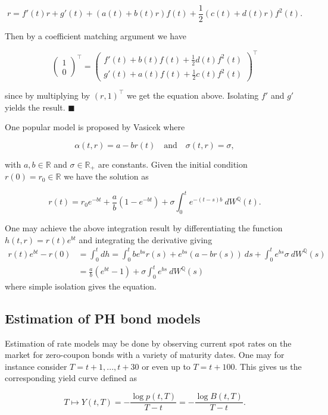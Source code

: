 \documentclass[a4paper,12pt,openany]{book}
\begin{document}
\[
 r=f'(t)r+g'(t)+(a(t)+b(t)r)f(t)+\frac{1}{2}(c(t)+d(t)r)f^2(t).
\]

Then by a coefficient matching argument we have

\[
\begin{pmatrix}
1\\ 0
\end{pmatrix}^\top=
\begin{pmatrix}
f'(t)+b(t)f(t)+\frac{1}{2}d(t)f^2(t)\\
g'(t)+a(t)f(t)+\frac{1}{2}c(t)f^2(t)
\end{pmatrix}^\top
\]

since by multiplying by \((r,1)^\top\) we get the equation above. Isolating \(f'\) and \(g'\) yields the result. \(\blacksquare\)

One popular model is proposed by Vasicek where

\[
\alpha(t,r)=a-br(t)\quad \text{and}\quad \sigma(t,r)=\sigma,
\]

with \(a,b\in \mathbb R\) and \(\sigma\in\mathbb R_+\) are constants. Given the initial condition \(r(0)=r_0\in\mathbb R\) we have the solution as

\[
r(t)=r_0e^{-bt}+\frac{a}{b}\left(1-e^{-bt}\right)+\sigma\int_0^t e^{-(t-s)b}\ dW^{\mathbb Q}(t).
\]

One may achieve the above integration result by differentiating the function \(h(t,r)=r(t)e^{bt}\) and integrating the derivative giving
\begin{align*}
r(t)e^{bt}-r(0)&=\int_0^tdh=\int_0^tbe^{bs}r(s)+e^{bs}(a-br(s))\ ds+\int_0^te^{bs}\sigma\ dW^{\mathbb Q}(s)\\
&=\frac{a}{b}(e^{bt}-1)+\sigma\int_0^te^{bs}\ dW^{\mathbb Q}(s)
\end{align*}
where simple isolation gives the equation.

\hypertarget{estimation-of-ph-bond-models}{%
\subsection{Estimation of PH bond models}\label{estimation-of-ph-bond-models}}

Estimation of rate models may be done by observing current spot rates on the market for zero-coupon bonds with a variety of maturity dates. One may for instance consider \(T=t+1,...,t+30\) or even up to \(T=t+100\). This gives us the corresponding yield curve defined as

\[
T\mapsto Y(t,T)=-\frac{\log p(t,T)}{T-t}=-\frac{\log B(t,T)}{T-t}.
\]
\end{document}
